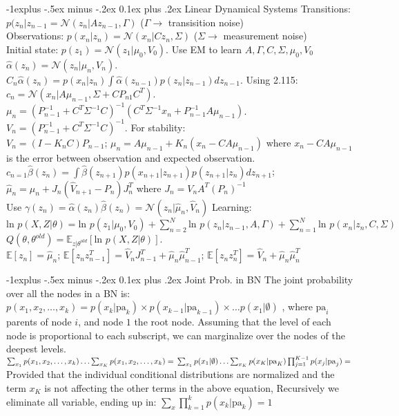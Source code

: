 \documentclass[9pt,landscape]{article}
\makeatletter
\renewcommand{\subsection}{\@startsection{subsection}{2}{0mm}%
                                {-1explus -.5ex minus -.2ex}%
                                {0.1ex plus .2ex}%
                                {\normalfont\scriptsize\bfseries}}
\makeatother
\begin{document}
\begin{multicols}{3}
\subsection{Linear Dynamical Systems}
Transitions: $p(z_n|z_{n-1} = \mathcal{N}(z_n|Az_{n-1}, \Gamma)$ ($\Gamma \rightarrow$ transisition noise)\\
Observations: $p(x_n|z_n) = \mathcal{N}(x_n|Cz_n, \Sigma)$ ($\Sigma \rightarrow$ measurement noise)\\
Initial state: $p(z_1) = \mathcal{N}(z_1|\mu_0, V_0)$. Use EM to learn $A, \Gamma, C, \Sigma, \mu_0, V_0$ \\
$\hat\alpha(z_n) = \mathcal{N}(z_n|\mu_n, V_n)$. \\
$C_n\hat\alpha(z_n) = p(x_n|z_n)\int\hat\alpha(z_{n-1})p(z_n|z_{n-1})dz_{n-1}$. Using 2.115: $c_n = \mathcal{N}(x_n|A\mu_{n-1},\Sigma+CP_{n1}C^T)$. $\mu_n = (P_{n-1}^{-1} + C^T\Sigma^{-1}C)^{-1} (C^T\Sigma^{-1}x_n + P_{n-1}^{-1}A\mu_{n-1})$. $V_n = (P_{n-1}^{-1} + C^T\Sigma^{-1}C)^{-1}$. For stability:\\
$V_n = (I-K_nC)P_{n-1}$; $\mu_n = A\mu_{n-1} + K_n(x_n - CA\mu_{n-1})$ where $x_n-CA\mu_{n-1}$ is the error between observation and expected observation.\\
$c_{n=1}\hat\beta(z_n) = \int \hat\beta(z_{n+1})p(x_{n+1}|z_{n+1}) p(z_{n+1}|z_n) dz_{n+1}$; $\hat\mu_n = \mu_n + J_n(\hat V_{n+1} - P_n)J_n^T$ where $J_n = V_nA^T(P_n)^{-1}$\\
Use $\gamma(z_n) = \hat\alpha(z_n)\hat\beta(z_n) = \mathcal{N}(z_n|\hat\mu_n, \hat V_n)$
Learning: $\text{ln } p(X,Z|\theta) = \text{ln } p(z_1|\mu_0, V_0) + \sum^N_{n=2} \text{ln } p(z_n|z_{n-1}, A, \Gamma) + \sum^N_{n=1} \text{ln } p(x_n|z_n, C, \Sigma)$ \\
$Q(\theta, \theta^{old}) = \mathbb{E}_{z|\theta^{old}}[\text{ln } p(X,Z|\theta)]$.\\
$\mathbb{E}[z_n] = \hat\mu_n$; $\mathbb{E}[z_nz_{n-1}^T] = \hat V_nJ_{n-1}^T+\hat\mu_n\hat\mu_{n-1}^T$; $\mathbb{E}[z_nz_n^T]= \hat V_n + \hat\mu_n\hat\mu_n^T$

\subsection{Joint Prob. in BN}
The joint probability over all the nodes in a BN is:
$
p(x_1,x_2,\ldots,x_k) = p(x_k|\mathrm{pa}_k) \times p(x_{k-1}|\mathrm{pa}_{k-1})\times \ldots p(x_1|\emptyset)
$
, where $\mathrm{pa}_i$ parents of node $i$, and node $1$ the root node. Assuming that the level of each node is proportional to each subscript, we can marginalize over the nodes of the deepest levels.
$
\sum_{x_1}p(x_1,x_2,\ldots,x_k) \ldots \sum_{x_K}p(x_1,x_2,\ldots,x_k) =\\
\sum_{x_1}p(x_1| \emptyset ) \ldots \sum_{x_K}p(x_K|\mathrm{pa}_K) \prod_{j=1}^{K-1}p(x_j|\mathrm{pa}_j) =\\
$
Provided that the individual conditional distributions are normalized and the term $x_K$ is not affecting the other terms in the above equation, Recursively we eliminate all variable, ending up in: $\sum_x\prod_{k=1}^kp(x_k|\mathrm{pa}_k) =1$
\vspace{.5em}

\end{multicols}
\end{document}
